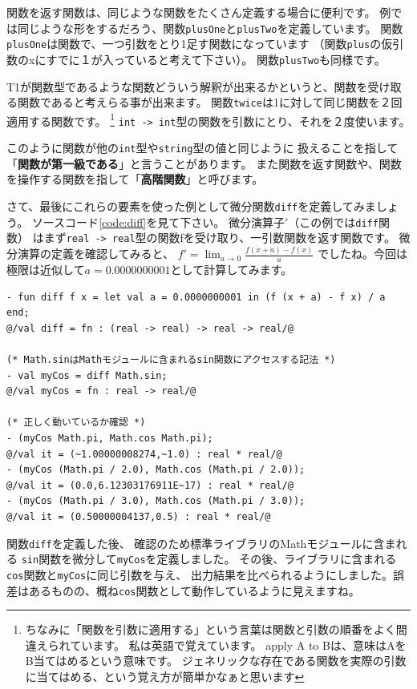 \documentclass[11pt,a4paper]{article}
\begin{document}
関数を返す関数は、同じような関数をたくさん定義する場合に便利です。
例では同じような形をするだろう、関数\lstinline{plusOne}と\lstinline{plusTwo}を定義しています。
関数\lstinline{plusOne}は関数で、一つ引数をとり1足す関数になっています
（関数\lstinline{plus}の仮引数のxにすでに１が入っていると考えて下さい）。
関数\lstinline{plusTwo}も同様です。

T1が関数型であるような関数どういう解釈が出来るかというと、関数を受け取る関数であると考えらる事が出来ます。
関数\lstinline{twice}は1に対して同じ関数を２回適用する関数です。
\footnote{
ちなみに「関数を引数に適用する」という言葉は関数と引数の順番をよく間違えられています。
私は英語で覚えています。
apply A to Bは、意味はAをB当てはめるという意味です。
ジェネリックな存在である関数を実際の引数に当てはめる、という覚え方が簡単かなぁと思います}
\lstinline{int -> int}型の関数を引数にとり、それを２度使います。

このように関数が他の\lstinline{int}型や\lstinline{string}型の値と同じように
扱えることを指して「{\bfseries 関数が第一級である}」と言うことがあります。
また関数を返す関数や、関数を操作する関数を指して「{\bfseries 高階関数}」と呼びます。

さて、最後にこれらの要素を使った例として微分関数\lstinline{diff}を定義してみましょう。
ソースコード\ref{code:diff}を見て下さい。
微分演算子$'$（この例では\lstinline{diff}関数）
はまず\lstinline{real -> real}型の関数fを受け取り、一引数関数を返す関数です。
微分演算の定義を確認してみると、
$f' = \lim_{a \to 0}\frac{f(x+a) - f(x)}{a}$
でしたね。今回は極限は近似して$a = 0.0000000001$として計算してみます。

\begin{lstlisting}[caption=高階関数の例,label=code:diff]
- fun diff f x = let val a = 0.0000000001 in (f (x + a) - f x) / a end;
@/val diff = fn : (real -> real) -> real -> real/@

(* Math.sinはMathモジュールに含まれるsin関数にアクセスする記法 *)
- val myCos = diff Math.sin;
@/val myCos = fn : real -> real/@

(* 正しく動いているか確認 *)
- (myCos Math.pi, Math.cos Math.pi);
@/val it = (~1.00000008274,~1.0) : real * real/@
- (myCos (Math.pi / 2.0), Math.cos (Math.pi / 2.0));
@/val it = (0.0,6.12303176911E~17) : real * real/@
- (myCos (Math.pi / 3.0), Math.cos (Math.pi / 3.0));
@/val it = (0.50000004137,0.5) : real * real/@
\end{lstlisting}

関数\lstinline{diff}を定義した後、
確認のため標準ライブラリのMathモジュールに含まれる
\lstinline{sin}関数を微分して\lstinline{myCos}を定義しました。
その後、ライブラリに含まれる\lstinline{cos}関数と\lstinline{myCos}に同じ引数を与え、
出力結果を比べられるようにしました。誤差はあるものの、概ね\lstinline{cos}関数として動作しているように見えますね。
\end{document}
